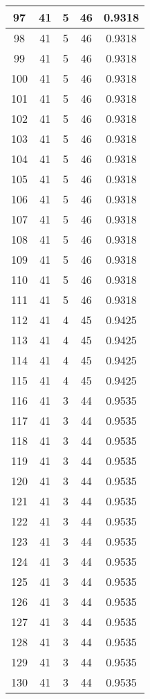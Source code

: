 \documentclass[letterpaper, 12pt]{article}
\begin{document}
\begin{longtable}{|c|c|c|c|c|}
\hline
97 & 41 & 5 & 46 & 0.9318 \\
\hline
98 & 41 & 5 & 46 & 0.9318 \\
\hline
99 & 41 & 5 & 46 & 0.9318 \\
\hline
100 & 41 & 5 & 46 & 0.9318 \\
\hline
101 & 41 & 5 & 46 & 0.9318 \\
\hline
102 & 41 & 5 & 46 & 0.9318 \\
\hline
103 & 41 & 5 & 46 & 0.9318 \\
\hline
104 & 41 & 5 & 46 & 0.9318 \\
\hline
105 & 41 & 5 & 46 & 0.9318 \\
\hline
106 & 41 & 5 & 46 & 0.9318 \\
\hline
107 & 41 & 5 & 46 & 0.9318 \\
\hline
108 & 41 & 5 & 46 & 0.9318 \\
\hline
109 & 41 & 5 & 46 & 0.9318 \\
\hline
110 & 41 & 5 & 46 & 0.9318 \\
\hline
111 & 41 & 5 & 46 & 0.9318 \\
\hline
112 & 41 & 4 & 45 & 0.9425 \\
\hline
113 & 41 & 4 & 45 & 0.9425 \\
\hline
114 & 41 & 4 & 45 & 0.9425 \\
\hline
115 & 41 & 4 & 45 & 0.9425 \\
\hline
116 & 41 & 3 & 44 & 0.9535 \\
\hline
117 & 41 & 3 & 44 & 0.9535 \\
\hline
118 & 41 & 3 & 44 & 0.9535 \\
\hline
119 & 41 & 3 & 44 & 0.9535 \\
\hline
120 & 41 & 3 & 44 & 0.9535 \\
\hline
121 & 41 & 3 & 44 & 0.9535 \\
\hline
122 & 41 & 3 & 44 & 0.9535 \\
\hline
123 & 41 & 3 & 44 & 0.9535 \\
\hline
124 & 41 & 3 & 44 & 0.9535 \\
\hline
125 & 41 & 3 & 44 & 0.9535 \\
\hline
126 & 41 & 3 & 44 & 0.9535 \\
\hline
127 & 41 & 3 & 44 & 0.9535 \\
\hline
128 & 41 & 3 & 44 & 0.9535 \\
\hline
129 & 41 & 3 & 44 & 0.9535 \\
\hline
130 & 41 & 3 & 44 & 0.9535 \\

\end{longtable}
\end{document}
